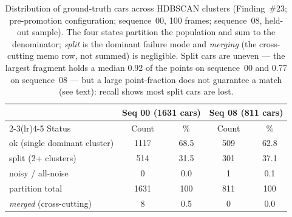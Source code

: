 \begin{table}[H]
  \centering
  \caption{Distribution of ground-truth cars across HDBSCAN clusters
    (Finding~\#23; pre-promotion configuration; sequence~00, \num{100} frames;
    sequence~08, held-out sample). The four states partition the population and sum
    to the denominator; \emph{split} is the dominant failure mode and \emph{merging}
    (the cross-cutting memo row, not summed) is negligible. Split cars are uneven ---
    the largest fragment holds a median \num{0.92} of the points on sequence~00 and
    \num{0.77} on sequence~08 --- but a large point-fraction does not guarantee a
    match (see text): recall shows most split cars are lost.}
  \label{tab:split}
  \begin{tabular}{lcccc}
    \toprule
    & \multicolumn{2}{c}{Seq 00 (\num{1631} cars)} & \multicolumn{2}{c}{Seq 08 (\num{811} cars)} \\
    \cmidrule(lr){2-3}\cmidrule(lr){4-5}
    Status & Count & \% & Count & \% \\
    \midrule
    ok (single dominant cluster) & 1117 & 68.5 & 509 & 62.8 \\
    split (2+ clusters)          & 514  & 31.5 & 301 & 37.1 \\
    noisy / all-noise            & 0    & 0.0  & 1   & 0.1  \\
    \midrule
    partition total              & 1631 & 100  & 811 & 100  \\
    \addlinespace
    \textit{merged} (cross-cutting) & 8 & 0.5 & 0 & 0.0 \\
    \bottomrule
  \end{tabular}
\end{table}

